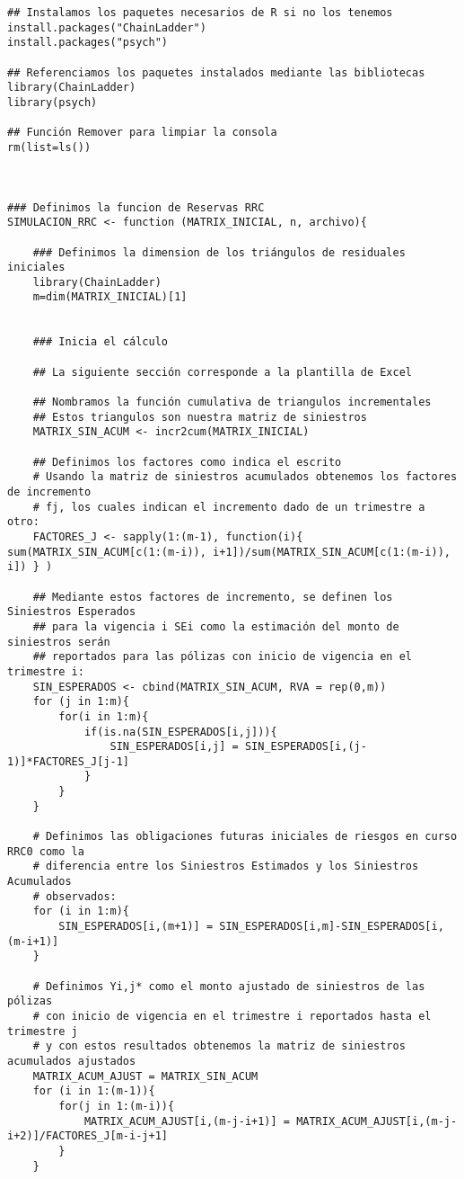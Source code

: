 \documentclass[11pt,twoside,openright,spanish]{report}
\numberwithin{equation}{chapter}
\numberwithin{figure}{chapter}
\numberwithin{table}{chapter}
\begin{document}
\begin{lstlisting}
## Instalamos los paquetes necesarios de R si no los tenemos
install.packages("ChainLadder")
install.packages("psych")

## Referenciamos los paquetes instalados mediante las bibliotecas
library(ChainLadder)
library(psych)

## Función Remover para limpiar la consola
rm(list=ls())



### Definimos la funcion de Reservas RRC
SIMULACION_RRC <- function (MATRIX_INICIAL, n, archivo){
	
	### Definimos la dimension de los triángulos de residuales iniciales
	library(ChainLadder)
	m=dim(MATRIX_INICIAL)[1]
	
	
	### Inicia el cálculo
	
	## La siguiente sección corresponde a la plantilla de Excel
	
	## Nombramos la función cumulativa de triangulos incrementales
	## Estos triangulos son nuestra matriz de siniestros
	MATRIX_SIN_ACUM <- incr2cum(MATRIX_INICIAL)
	
	## Definimos los factores como indica el escrito
	# Usando la matriz de siniestros acumulados obtenemos los factores de incremento
	# fj, los cuales indican el incremento dado de un trimestre a otro:
	FACTORES_J <- sapply(1:(m-1), function(i){ sum(MATRIX_SIN_ACUM[c(1:(m-i)), i+1])/sum(MATRIX_SIN_ACUM[c(1:(m-i)), i]) } )
	
	## Mediante estos factores de incremento, se definen los Siniestros Esperados
	## para la vigencia i SEi como la estimación del monto de siniestros serán 
	## reportados para las pólizas con inicio de vigencia en el trimestre i:
	SIN_ESPERADOS <- cbind(MATRIX_SIN_ACUM, RVA = rep(0,m))
	for (j in 1:m){
		for(i in 1:m){
			if(is.na(SIN_ESPERADOS[i,j])){
				SIN_ESPERADOS[i,j] = SIN_ESPERADOS[i,(j-1)]*FACTORES_J[j-1]
			}
		}
	}
	
	# Definimos las obligaciones futuras iniciales de riesgos en curso RRC0 como la 
	# diferencia entre los Siniestros Estimados y los Siniestros Acumulados
	# observados:
	for (i in 1:m){
		SIN_ESPERADOS[i,(m+1)] = SIN_ESPERADOS[i,m]-SIN_ESPERADOS[i,(m-i+1)]
	}
	
	# Definimos Yi,j* como el monto ajustado de siniestros de las pólizas
	# con inicio de vigencia en el trimestre i reportados hasta el trimestre j
	# y con estos resultados obtenemos la matriz de siniestros acumulados ajustados
	MATRIX_ACUM_AJUST = MATRIX_SIN_ACUM
	for (i in 1:(m-1)){
		for(j in 1:(m-i)){
			MATRIX_ACUM_AJUST[i,(m-j-i+1)] = MATRIX_ACUM_AJUST[i,(m-j-i+2)]/FACTORES_J[m-i-j+1]
		}
	}
	

\end{lstlisting}
\end{document}
